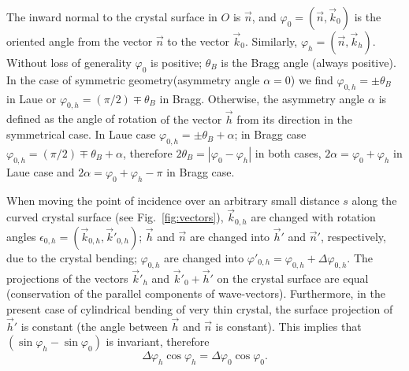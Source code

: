 \documentclass[preprint]{iucr}              %
\newcommand{\inred}[1]{{\color{red}#1}}
\begin{document}
\inred{The inward normal to the crystal surface in $O$ is $\vec n$, and $\varphi_0 = (\vec n, \vec k_0)$ is the oriented angle from the vector $\vec n$ to the vector $\vec k_0$. Similarly,} $\varphi_h = (\vec n, \vec k_h)$. Without loss of generality $\varphi_0$ is positive; $\theta_B$ is the Bragg angle \inred{(always positive)}.
\inred{In the}  case of symmetric geometry(asymmetry angle $\alpha=0$) \inred{we find} $\varphi_{0,h}=\pm\theta_B$ in Laue or $\varphi_{0,h}=(\pi/2)\mp\theta_B$ in Bragg. Otherwise, the asymmetry angle $\alpha$ is defined as the angle of rotation \inred{of the vector $\vec h$ from its direction in the symmetrical case}. 
In Laue case $\varphi_{0,h}=\pm\theta_B+\alpha$; in Bragg case $\varphi_{0,h}=(\pi/2)\mp\theta_B+\alpha$, therefore $2\theta_B=|\varphi_0-\varphi_h|$ in both cases, $2\alpha=\varphi_0+\varphi_h$ in Laue case and $2\alpha=\varphi_0+\varphi_h-\pi$ in Bragg case.


When moving the point of incidence over an arbitrary small distance $s$ along the curved crystal surface (see Fig.~\ref{fig:vectors}), 
$\vec k_{0,h}$ are changed
with rotation angles $\epsilon_{0,h} = (\vec k_{0,h},\vec k'_{0,h})$; $\vec h$ and $\vec n$ are changed into $\vec h'$ and $\vec n'$, respectively, due to the crystal bending;
$\varphi_{0,h}$ are changed into $\varphi'_{0,h}=\varphi_{0,h}+\Delta \varphi_{0,h}$.
The projections of the vectors $\vec k'_{h}$ and $\vec k'_{0}+\vec h'$ on the crystal surface are equal \inred{(}conservation of the parallel components of wave-vectors\inred{)}.
Furthermore, in the present case of cylindrical bending \inred{of very thin crystal}, the surface projection of $\vec h'$ is constant (the angle between $\vec h$ and $\vec n$ is constant).
This implies that $(\sin \varphi_h - \sin \varphi_0)$ is invariant, therefore
\begin{equation}
\label{eq:invariant}
    \Delta \varphi_h \cos\varphi_h = \Delta \varphi_0 \cos\varphi_0.
\end{equation}
\end{document}
